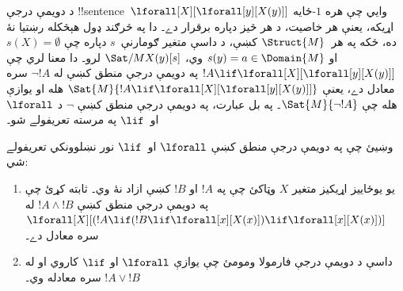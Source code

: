 \documentclass[../../../include/open-logic-section]{subfiles}
\begin{document}
\begin{ex}
  د دويمې درجې !!{sentence}~$\lforall[X][\lforall[y][X(y)]]$ وايي
  چې هره $1$-ځايه اړيکه، يعنې هر خاصيت، د هر څيز دپاره برقرار دے۔
  دا په څرګند ډول هېڅکله رښتيا نۀ ده، ځکه په هر~$\Struct{M}$ کښې،
  د داسې متغير ګومارنې~$s$ دپاره چې $s(X) = \emptyset$ او
  $s(y) = a \in \Domain{M}$ وي، $\Sat/{M}{X(y)}[s]$ لرو۔ دا معنا
  لري چې $!A \lif \lforall[X][\lforall[y][X(y)]]$ په دويمې درجې
  منطق کښې له $\lnot !A$ سره معادل دے، يعنې
  $\Sat{M}{!A \lif
  \lforall[X][\lforall[y][X(y)]]}$ هله او يوازې هله چې
  $\Sat{M}{\lnot !A}$۔ په بل عبارت، په دويمې درجې منطق کښې
  $\lnot$ د $\lforall$ او~$\lif$ په مرسته تعريفولے شو۔
\end{ex}

\begin{prob}
  وښيئ چې په دويمې درجې منطق کښې $\lforall$ او~$\lif$ نور
  نښلوونکي تعريفولے شي:
  \begin{enumerate}
    \item يو يوځاييز اړيکيز متغير $X$ وټاکئ چې په $!A$ او $!B$ کښې ازاد نۀ وي۔ ثابته کړئ چې په دويمې درجې منطق کښې $!A \land !B$ له
    $\lforall[X][(!A \lif (!B \lif \lforall[x][X(x)])\lif
    \lforall[x][X(x)])]$ سره معادل دے۔
    \item داسې د دويمې درجې فارمولا ومومئ چې يوازې $\lforall$ او
    $\lif$ کاروي او له $!A \lor !B$ سره معادله وي۔
  \end{enumerate}
\end{prob}
\end{document}
